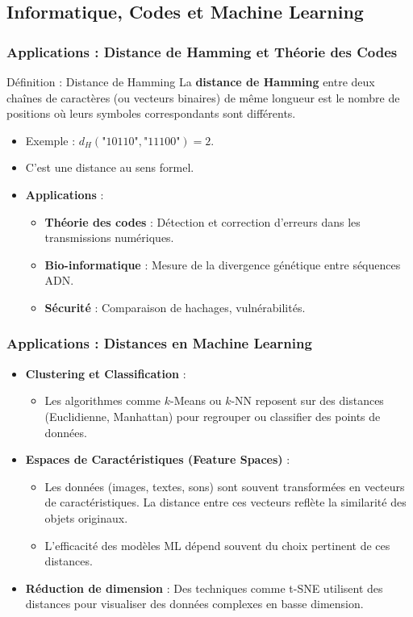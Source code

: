 \documentclass{beamer}
\begin{document}
\subsection*{Informatique, Codes et Machine Learning}
\begin{frame}
    \frametitle{Applications : Distance de Hamming et Théorie des Codes}
    \begin{block}{Définition : Distance de Hamming}
        La \textbf{distance de Hamming} entre deux chaînes de caractères (ou vecteurs binaires) de même longueur est le nombre de positions où leurs symboles correspondants sont différents.
    \end{block}
    \begin{itemize}
        \item Exemple : $d_H(\text{"10110"}, \text{"11100"}) = 2$.
        \item C'est une distance au sens formel.
        \item \textbf{Applications} :
            \begin{itemize}
                \item \textbf{Théorie des codes} : Détection et correction d'erreurs dans les transmissions numériques.
                \item \textbf{Bio-informatique} : Mesure de la divergence génétique entre séquences ADN.
                \item \textbf{Sécurité} : Comparaison de hachages, vulnérabilités.
            \end{itemize}
    \end{itemize}
\end{frame}

\begin{frame}
    \frametitle{Applications : Distances en Machine Learning}
    \begin{itemize}
        \item \textbf{Clustering et Classification} :
            \begin{itemize}
                \item Les algorithmes comme $k$-Means ou $k$-NN reposent sur des distances (Euclidienne, Manhattan) pour regrouper ou classifier des points de données.
            \end{itemize}
        \item \textbf{Espaces de Caractéristiques (Feature Spaces)} :
            \begin{itemize}
                \item Les données (images, textes, sons) sont souvent transformées en vecteurs de caractéristiques. La distance entre ces vecteurs reflète la similarité des objets originaux.
                \item L'efficacité des modèles ML dépend souvent du choix pertinent de ces distances.
            \end{itemize}
        \item \textbf{Réduction de dimension} : Des techniques comme t-SNE utilisent des distances pour visualiser des données complexes en basse dimension.
    \end{itemize}
\end{frame}
\end{document}
